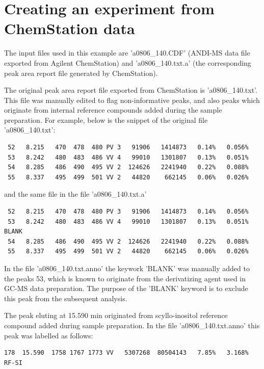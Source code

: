 \section{Creating an experiment from ChemStation data}


The input files used in this example are 'a0806\_140.CDF' (ANDI-MS data
file exported from Agilent ChemStation) and 'a0806\_140.txt.a' (the 
corresponding peak area report file generated by ChemStation).

The original peak area report file exported from ChemStation is
'a0806\_140.txt'. This file was manually edited to flag non-informative
peaks, and also peaks which originate from internal reference compounds
added during the sample preparation. For example, below is the snippet
of the original file 'a0806\_140.txt':

\begin{verbatim}
 52   8.215   470  478  480 PV 3   91906   1414873   0.14%   0.056%
 53   8.242   480  483  486 VV 4   99010   1301807   0.13%   0.051%
 54   8.285   486  490  495 VV 2  124626   2241940   0.22%   0.088%
 55   8.337   495  499  501 VV 2   44820    662145   0.06%   0.026%
\end{verbatim}

\noindent
and the same file in the file 'a0806\_140.txt.a'

\begin{verbatim}
 52   8.215   470  478  480 PV 3   91906   1414873   0.14%   0.056%
 53   8.242   480  483  486 VV 4   99010   1301807   0.13%   0.051% BLANK
 54   8.285   486  490  495 VV 2  124626   2241940   0.22%   0.088%
 55   8.337   495  499  501 VV 2   44820    662145   0.06%   0.026%
\end{verbatim}

\noindent
In the file 'a0806\_140.txt.anno' the keywork 'BLANK' was manually added to
the peaks 53, which is known to originate from the derivatizing agent used
in GC-MS data preparation.  The purpose of the 'BLANK' keyword is to
exclude this peak from the subsequent analysis.

The peak eluting at 15.590 min originated from scyllo-inositol reference
compound added during sample preparation. In the file 'a0806\_140.txt.anno'
this peak was labelled as follows:

\begin{verbatim}
178  15.590  1758 1767 1773 VV   5307268  80504143   7.85%   3.168% RF-SI
\end{verbatim}

